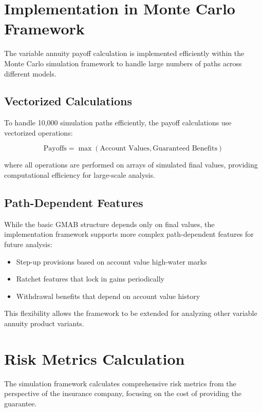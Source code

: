 \documentclass[12pt,a4paper]{report}
\begin{document}
\section{Implementation in Monte Carlo Framework}

The variable annuity payoff calculation is implemented efficiently within the Monte Carlo simulation framework to handle large numbers of paths across different models.

\subsection{Vectorized Calculations}

To handle 10,000 simulation paths efficiently, the payoff calculations use vectorized operations:

\begin{equation}
\text{Payoffs} = \max(\text{Account Values}, \text{Guaranteed Benefits})
\end{equation}

where all operations are performed on arrays of simulated final values, providing computational efficiency for large-scale analysis.

\subsection{Path-Dependent Features}

While the basic GMAB structure depends only on final values, the implementation framework supports more complex path-dependent features for future analysis:

\begin{itemize}
\item Step-up provisions based on account value high-water marks
\item Ratchet features that lock in gains periodically  
\item Withdrawal benefits that depend on account value history
\end{itemize}

This flexibility allows the framework to be extended for analyzing other variable annuity product variants.

\section{Risk Metrics Calculation}

The simulation framework calculates comprehensive risk metrics from the perspective of the insurance company, focusing on the cost of providing the guarantee.
\end{document}

